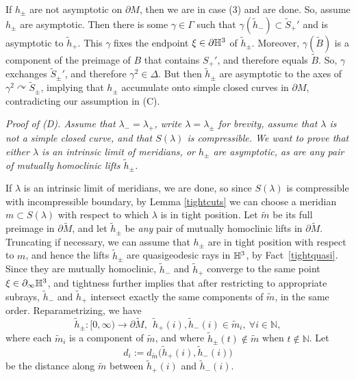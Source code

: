 \documentclass[12pt]{amsart}
\theoremstyle{definition}
\theoremstyle{remark}
\newcommand{\BN}{\mathbb N} \newcommand{\BQ}{\mathbb Q}
\newcommand{\actson}{\curvearrowright}
\begin{document}
If $h_\pm$ are not asymptotic on $\partial M$, then we are in case (3) and are done. So, assume $h_\pm$ are asymptotic. Then there is some $\gamma \in \Gamma$ such that $\gamma(\tilde h_-) \subset \tilde S_+'$ and is asymptotic to $\tilde h_+$. This $\gamma$ fixes the endpoint $\xi\in\partial \mathbb H^3$ of $\tilde h_\pm$. Moreover, $\gamma(\tilde B) $ is a component of the preimage of $B$ that contains $S_+'$, and therefore equals $\tilde B$. So, $\gamma$ exchanges $\tilde S_\pm'$, and therefore $\gamma^2 \in \Delta$. But then $\tilde h_\pm$ are asymptotic to the axes of $\gamma^2 \actson \tilde S_\pm$, implying that $ h_\pm$ accumulate onto simple closed curves in $\partial M$, contradicting our assumption in (C).

\medskip
 

\noindent \it Proof of (D). \rm Assume that $\lambda_-=\lambda_+$, write $\lambda=\lambda_\pm$ for brevity, assume that $\lambda$ is not a simple closed curve, and that $S(\lambda)$ is compressible.  We want to prove that  either $\lambda $ is an intrinsic limit of meridians, or $h_\pm$ are asymptotic, as are any pair of mutually homoclinic lifts $\tilde h_\pm$.


 If $\lambda$ is an intrinsic limit of meridians, we are done, so since $S(\lambda)$ is compressible with incompressible boundary, by Lemma \ref{tightcuts}  we can choose a meridian $m \subset S(\lambda)$ with respect to which $\lambda $ is in tight position.  Let $\tilde m$ be its  full preimage in $\partial \tilde M$, and let $\tilde h_\pm$ be \emph{any} pair of mutually homoclinic lifts in $\partial \tilde M$. Truncating if necessary, we can assume that $h_\pm$ are in tight position with respect to $m$, and hence the lifts $\tilde h_\pm$ are quasigeodesic rays in $\mathbb H^3$, by Fact~\ref{tightquasi}.  Since they are mutually homoclinic, $\tilde h_-$ and $\tilde h_+$ converge to the same point $\xi \in \partial_\infty \mathbb H^3$, and tightness further implies that after restricting to appropriate subrays, $\tilde h_-$ and $\tilde h_+$ intersect exactly the same components of $\tilde m$, in the same order. Reparametrizing, we have
$$\tilde h_\pm : [0,\infty) \longrightarrow  \partial \tilde M, \ \ \tilde h_+ (i), \tilde h_-(i) \in \tilde m_i, \ \forall i\in \BN,$$
where each $\tilde m_i$ is a component of $\tilde m$, and where $\tilde h_\pm(t) \not \in \tilde m$ when $t\not \in \BN$. Let $$d_i := d_{\tilde m} \big ( \tilde h_+ (i) , \tilde h_- (i) \big )$$ be the distance along $\tilde m$  between $\tilde h_+ (i)$ and $ \tilde h_-(i)$. 
\end{document}
